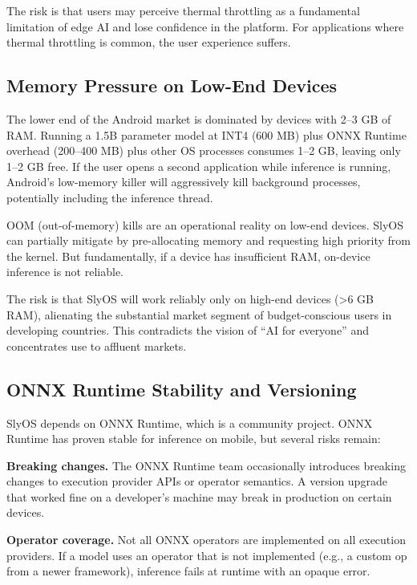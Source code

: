 \documentclass[12pt, letterpaper, twoside]{report}
\begin{document}
The risk is that users may perceive thermal throttling as a fundamental limitation of edge AI and lose confidence in the platform. For applications where thermal throttling is common, the user experience suffers.

\subsection{Memory Pressure on Low-End Devices}
\label{subsec:memory_risk}

The lower end of the Android market is dominated by devices with 2--3 GB of RAM. Running a 1.5B parameter model at INT4 (600 MB) plus ONNX Runtime overhead (200--400 MB) plus other OS processes consumes 1--2 GB, leaving only 1--2 GB free. If the user opens a second application while inference is running, Android's low-memory killer will aggressively kill background processes, potentially including the inference thread.

OOM (out-of-memory) kills are an operational reality on low-end devices. SlyOS can partially mitigate by pre-allocating memory and requesting high priority from the kernel. But fundamentally, if a device has insufficient RAM, on-device inference is not reliable.

The risk is that SlyOS will work reliably only on high-end devices (>6 GB RAM), alienating the substantial market segment of budget-conscious users in developing countries. This contradicts the vision of ``AI for everyone'' and concentrates use to affluent markets.

\subsection{ONNX Runtime Stability and Versioning}
\label{subsec:onnx_risk}

SlyOS depends on ONNX Runtime, which is a community project. ONNX Runtime has proven stable for inference on mobile, but several risks remain:

\textbf{Breaking changes.} The ONNX Runtime team occasionally introduces breaking changes to execution provider APIs or operator semantics. A version upgrade that worked fine on a developer's machine may break in production on certain devices.

\textbf{Operator coverage.} Not all ONNX operators are implemented on all execution providers. If a model uses an operator that is not implemented (e.g., a custom op from a newer framework), inference fails at runtime with an opaque error.
\end{document}
